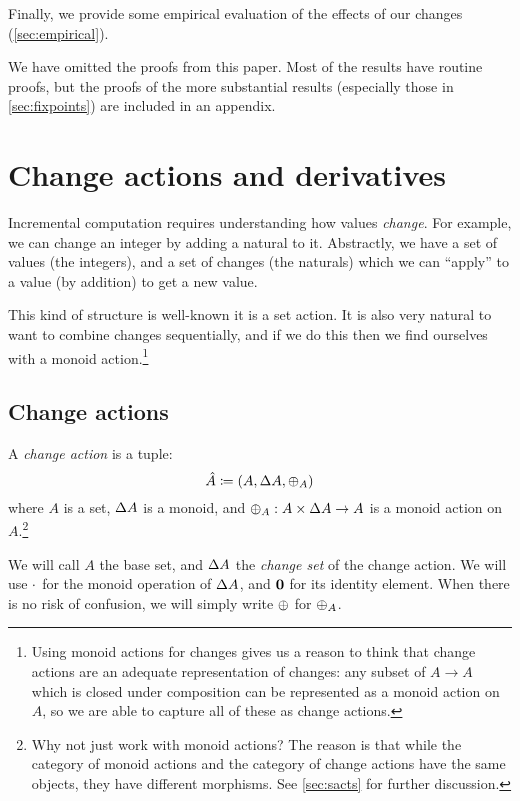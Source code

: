 Finally, we provide some empirical evaluation of the effects
of our changes (\cref{sec:empirical}).

We have omitted the proofs from this paper. Most of the results have routine
proofs, but the proofs of the more substantial results
(especially those in \cref{sec:fixpoints}) are included in an appendix.

\section{Change actions and derivatives}
\label{sec:changeActions}

Incremental computation requires understanding how values \emph{change}. For
example, we can change an integer by adding a natural to it.
Abstractly, we have a set of values (the integers), and a set of changes
(the naturals) which we can ``apply'' to a value (by addition) to get a new value.

This kind of structure is well-known \textemdash{} it is a set action. It is
also very natural to want to combine changes sequentially, and if we do this
then we find ourselves with a monoid action.\footnote{
Using monoid actions for changes gives us a reason to think that
change actions are an adequate representation of changes: any subset of $A
\rightarrow A$ which is closed under composition can be
represented as a monoid action on $A$, so we are able to capture all of these as change
actions.}

\subsection{Change actions}
\label{sec:changeAction}

\begin{defn}
  A \emph{change action} is a tuple:
  \begin{displaymath}
    \hat{A} \coloneqq (A,\Delta A,\oplus_A)
  \end{displaymath}
  where $A$ is a set, $\Delta A$ is a monoid, and $\oplus_A : A \times \Delta A \rightarrow A$ is a monoid action on $A$.\footnote{Why not
    just work with monoid actions? The reason is that while the category of
    monoid actions and the category of change actions have the same objects, they
  have different morphisms. See \cref{sec:sacts} for further discussion.}

  We will call $A$ the base set, and $\Delta A$ the \emph{change set} of the change
  action. We will use $\cdot$ for the monoid operation of $\Delta A$, and
  $\mathbf{0}$ for its identity element. 
  When there is no risk of confusion, we will simply write $\oplus$ for $\oplus_A$.
\end{defn}

